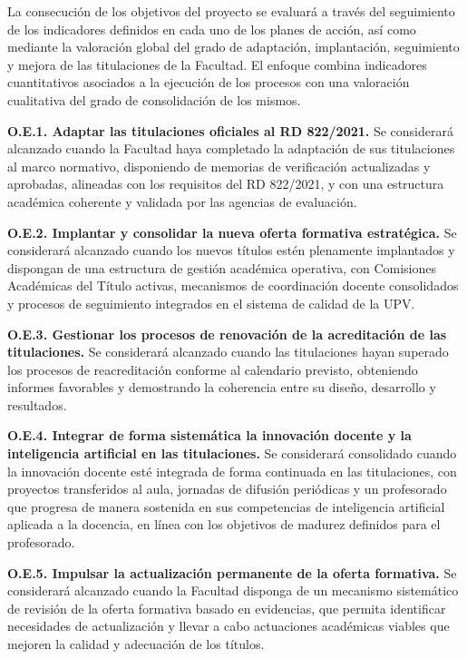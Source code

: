 \documentclass[11pt,a4paper]{scrreprt}
\begin{document}
\small
La consecución de los objetivos del proyecto se evaluará a través del seguimiento de los indicadores definidos en cada uno de los planes de acción, así como mediante la valoración global del grado de adaptación, implantación, seguimiento y mejora de las titulaciones de la Facultad. El enfoque combina indicadores cuantitativos asociados a la ejecución de los procesos con una valoración cualitativa del grado de consolidación de los mismos.

\textbf{O.E.1. Adaptar las titulaciones oficiales al RD 822/2021.} Se considerará alcanzado cuando la Facultad haya completado la adaptación de sus titulaciones al marco normativo, disponiendo de memorias de verificación actualizadas y aprobadas, alineadas con los requisitos del RD 822/2021, y con una estructura académica coherente y validada por las agencias de evaluación.

\textbf{O.E.2. Implantar y consolidar la nueva oferta formativa estratégica.} Se considerará alcanzado cuando los nuevos títulos estén plenamente implantados y dispongan de una estructura de gestión académica operativa, con Comisiones Académicas del Título activas, mecanismos de coordinación docente consolidados y procesos de seguimiento integrados en el sistema de calidad de la UPV.

\textbf{O.E.3. Gestionar los procesos de renovación de la acreditación de las titulaciones.} Se considerará alcanzado cuando las titulaciones hayan superado los procesos de reacreditación conforme al calendario previsto, obteniendo informes favorables y demostrando la coherencia entre su diseño, desarrollo y resultados.

\textbf{O.E.4. Integrar de forma sistemática la innovación docente y la inteligencia artificial en las titulaciones.} Se considerará consolidado cuando la innovación docente esté integrada de forma continuada en las titulaciones, con proyectos transferidos al aula, jornadas de difusión periódicas y un profesorado que progresa de manera sostenida en sus competencias de inteligencia artificial aplicada a la docencia, en línea con los objetivos de madurez definidos para el profesorado.

\textbf{O.E.5. Impulsar la actualización permanente de la oferta formativa.} Se considerará alcanzado cuando la Facultad disponga de un mecanismo sistemático de revisión de la oferta formativa basado en evidencias, que permita identificar necesidades de actualización y llevar a cabo actuaciones académicas viables que mejoren la calidad y adecuación de los títulos.
\end{document}

